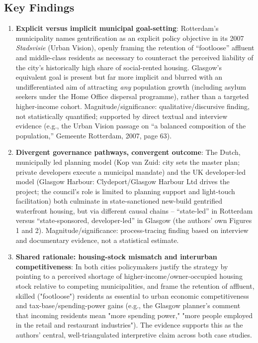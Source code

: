 \subsection*{Key Findings}

\begin{enumerate}
  \item \textbf{Explicit versus implicit municipal goal-setting}: Rotterdam's municipality names gentrification as an explicit policy objective in its 2007 \emph{Stadsvisie} (Urban Vision), openly framing the retention of ``footloose'' affluent and middle-class residents as necessary to counteract the perceived liability of the city's historically high share of social-rented housing. Glasgow's equivalent goal is present but far more implicit and blurred with an undifferentiated aim of attracting \emph{any} population growth (including asylum seekers under the Home Office dispersal programme), rather than a targeted higher-income cohort. Magnitude/significance: qualitative/discursive finding, not statistically quantified; supported by direct textual and interview evidence (e.g., the Urban Vision passage on ``a balanced composition of the population,'' Gemeente Rotterdam, 2007, page 63).
  \item \textbf{Divergent governance pathways, convergent outcome}: The Dutch, municipally led planning model (Kop van Zuid: city sets the master plan; private developers execute a municipal mandate) and the UK developer-led model (Glasgow Harbour: Clydeport/Glasgow Harbour Ltd drives the project; the council's role is limited to planning support and light-touch facilitation) both culminate in state-sanctioned new-build gentrified waterfront housing, but via different causal chains -- ``state-led'' in Rotterdam versus ``state-sponsored, developer-led'' in Glasgow (the authors' own Figures 1 and 2). Magnitude/significance: process-tracing finding based on interview and documentary evidence, not a statistical estimate.
  \item \textbf{Shared rationale: housing-stock mismatch and interurban competitiveness}: In both cities policymakers justify the strategy by pointing to a perceived shortage of higher-income/owner-occupied housing stock relative to competing municipalities, and frame the retention of affluent, skilled ("footloose") residents as essential to urban economic competitiveness and tax-base/spending-power gains (e.g., the Glasgow planner's comment that incoming residents mean "more spending power," "more people employed in the retail and restaurant industries"). The evidence supports this as the authors' central, well-triangulated interpretive claim across both case studies.

\end{enumerate}
